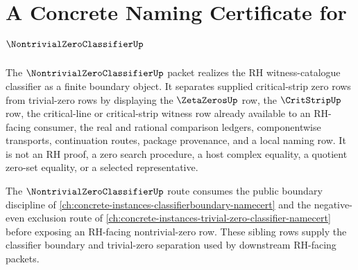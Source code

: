 \chapter{A Concrete Naming Certificate for $\NontrivialZeroClassifierUp$}
\label{ch:concrete-instances-nontrivial-zero-classifier-namecert}

The $\NontrivialZeroClassifierUp$ packet realizes the RH witness-catalogue classifier as a finite boundary object. It separates supplied critical-strip zero rows from trivial-zero rows by displaying the $\ZetaZerosUp$ row, the $\CritStripUp$ row, the critical-line or critical-strip witness row already available to an RH-facing consumer, the real and rational comparison ledgers, componentwise transports, continuation routes, package provenance, and a local naming row. It is not an RH proof, a zero search procedure, a host complex equality, a quotient zero-set equality, or a selected representative.

The $\NontrivialZeroClassifierUp$ route consumes the public boundary discipline of \autoref{ch:concrete-instances-classifierboundary-namecert} and the negative-even exclusion route of \autoref{ch:concrete-instances-trivial-zero-classifier-namecert} before exposing an RH-facing nontrivial-zero row. These sibling rows supply the classifier boundary and trivial-zero separation used by downstream RH-facing packets.

